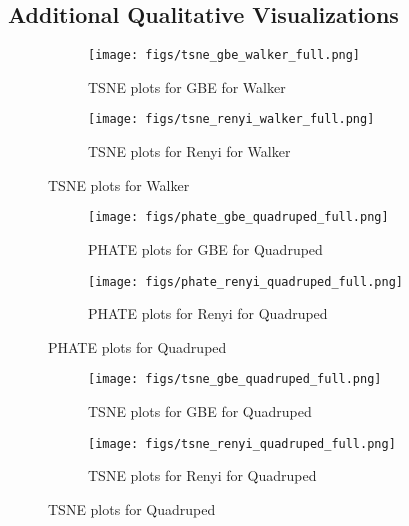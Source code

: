 \newpage
\subsection{Additional Qualitative Visualizations}

\begin{figure}[ht]
    \begin{subfigure}[b]{0.98\textwidth}
        \texttt{[image: figs/tsne\_gbe\_walker\_full.png]}
        \caption{TSNE plots for GBE for Walker}
        \label{fig:tsne_gbe_walker_full}
    \end{subfigure}
    \centering
    
    \begin{subfigure}[b]{0.98\textwidth}
        \texttt{[image: figs/tsne\_renyi\_walker\_full.png]}
        \caption{TSNE plots for Renyi for Walker}
        \label{fig:tsne_renyi_walker_full}
    \end{subfigure}
    \caption{TSNE plots for Walker }
    \label{fig:TSNE_walker_full}

\end{figure}



\begin{figure}[]
    \begin{subfigure}[b]{0.98\textwidth}
        \texttt{[image: figs/phate\_gbe\_quadruped\_full.png]}
        \caption{PHATE plots for GBE for Quadruped}
        \label{fig:phate_gbe_walker_full}
    \end{subfigure}
    \centering
    
    \begin{subfigure}[b]{0.98\textwidth}
        \texttt{[image: figs/phate\_renyi\_quadruped\_full.png]}
        \caption{PHATE plots for Renyi for Quadruped}
        \label{fig:phate_renyi_quadruped_full}
    \end{subfigure}
    \caption{PHATE plots for Quadruped }
    \label{fig:phate_quadruped_full}
\end{figure}

\begin{figure}[]
    \begin{subfigure}[b]{0.98\textwidth}
        \texttt{[image: figs/tsne\_gbe\_quadruped\_full.png]}
        \caption{TSNE plots for GBE for Quadruped}
        \label{fig:tsne_gbe_walker_full}
    \end{subfigure}
    \centering
    
    \begin{subfigure}[b]{0.98\textwidth}
        \texttt{[image: figs/tsne\_renyi\_quadruped\_full.png]}
        \caption{TSNE plots for Renyi for Quadruped}
        \label{fig:tsne_renyi_quadruped_full}
    \end{subfigure}
    \caption{TSNE plots for Quadruped }
    \label{fig:tsne_quadruped_full}
\end{figure}


